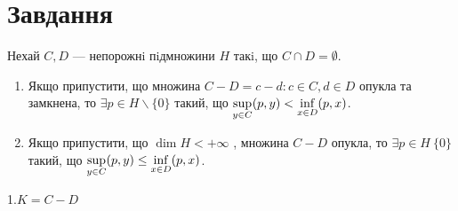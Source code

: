 
\chapter{Завдання \theHchapter}


\begin{tcolorbox}[title=Завдання]
    Нехай $C, D$ — непорожнi пiдмножини $H$ такi, що 
    $C \cap D = \emptyset$. 
    \begin{enumerate}
        \item 
            Якщо припустити, що множина 
            $C - D = {c - d : c \in C, d \in D}$ 
            опукла та замкнена,
            то $ \exists p \in H \backslash \{0\}$ такий, що 
            $ \displaystyle\sup_{y \in C} (p, y) < \displaystyle\inf_{x \in D} (p, x)$.
        \item
            Якщо припустити, що $\dim H < +\infty$ , множина $C - D$
            опукла, то $\exists p \in H\ \{0\}$
            такий, що 
            $\displaystyle\sup_{y \in C} (p, y) \le \displaystyle\inf_{x \in D}(p, x)$.
    \end{enumerate}
    
\end{tcolorbox}





1.$ K = C - D $



